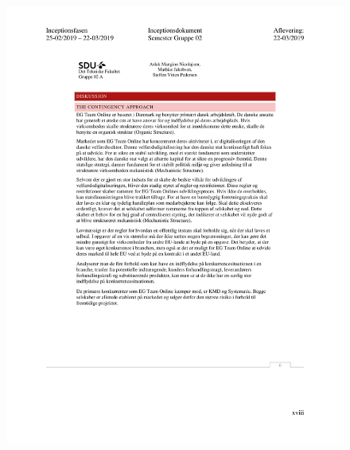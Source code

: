 \begin{figure}[hb]
  \includegraphics[scale = 0.33]{./PNG/Inceptions/Gruppe02+InceptionsDokument-51.jpg} 
\end{figure}

